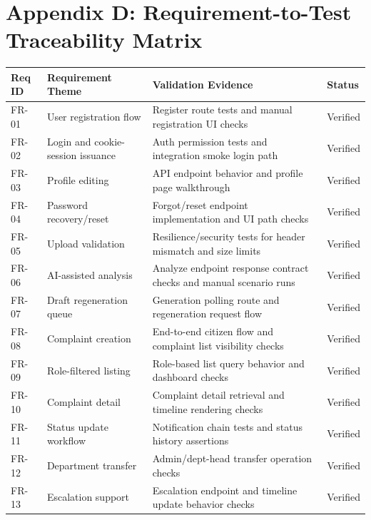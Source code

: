 \section{Appendix D: Requirement-to-Test Traceability Matrix}

\small
\begin{xltabular}{\textwidth}{|>{\RaggedRight\arraybackslash}p{0.11\textwidth}|>{\RaggedRight\arraybackslash}p{0.20\textwidth}|>{\RaggedRight\arraybackslash}X|>{\RaggedRight\arraybackslash}p{0.12\textwidth}|}
\hline
\textbf{Req ID} & \textbf{Requirement Theme} & \textbf{Validation Evidence} & \textbf{Status} \\ \hline
\endhead
FR-01 & User registration flow & Register route tests and manual registration UI checks & Verified \\ \hline
FR-02 & Login and cookie-session issuance & Auth permission tests and integration smoke login path & Verified \\ \hline
FR-03 & Profile editing & API endpoint behavior and profile page walkthrough & Verified \\ \hline
FR-04 & Password recovery/reset & Forgot/reset endpoint implementation and UI path checks & Verified \\ \hline
FR-05 & Upload validation & Resilience/security tests for header mismatch and size limits & Verified \\ \hline
FR-06 & AI-assisted analysis & Analyze endpoint response contract checks and manual scenario runs & Verified \\ \hline
FR-07 & Draft regeneration queue & Generation polling route and regeneration request flow & Verified \\ \hline
FR-08 & Complaint creation & End-to-end citizen flow and complaint list visibility checks & Verified \\ \hline
FR-09 & Role-filtered listing & Role-based list query behavior and dashboard checks & Verified \\ \hline
FR-10 & Complaint detail & Complaint detail retrieval and timeline rendering checks & Verified \\ \hline
FR-11 & Status update workflow & Notification chain tests and status history assertions & Verified \\ \hline
FR-12 & Department transfer & Admin/dept-head transfer operation checks & Verified \\ \hline
FR-13 & Escalation support & Escalation endpoint and timeline update behavior checks & Verified \\ \hline

\end{xltabular}
